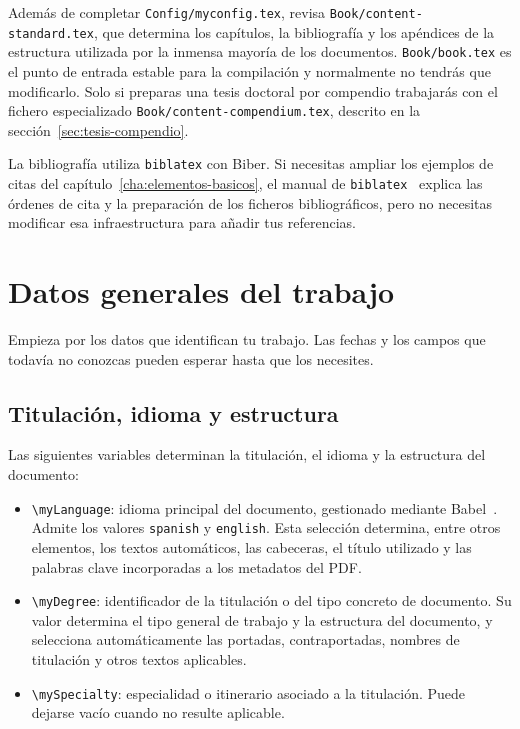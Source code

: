 Además de completar \texttt{Config/myconfig.tex}, revisa \texttt{Book/content-standard.tex}, que determina los capítulos, la bibliografía y los apéndices de la estructura utilizada por la inmensa mayoría de los documentos. \texttt{Book/book.tex} es el punto de entrada estable para la compilación y normalmente no tendrás que modificarlo. Solo si preparas una tesis doctoral por compendio trabajarás con el fichero especializado \texttt{Book/content-compendium.tex}, descrito en la sección~\ref{sec:tesis-compendio}.

La bibliografía utiliza \texttt{biblatex} con Biber. Si necesitas ampliar los ejemplos de citas del capítulo~\ref{cha:elementos-basicos}, el manual de \texttt{biblatex}~\cite{biblatex-manual} explica las órdenes de cita y la preparación de los ficheros bibliográficos, pero no necesitas modificar esa infraestructura para añadir tus referencias.

\section{Datos generales del trabajo}
\label{sec:datos-generales-configuracion}

Empieza por los datos que identifican tu trabajo. Las fechas y los campos que todavía no conozcas pueden esperar hasta que los necesites.

\subsection{Titulación, idioma y estructura}

Las siguientes variables determinan la titulación, el idioma y la estructura del documento:

\begin{itemize}
  \item \texttt{\textbackslash{}myLanguage}: idioma principal del documento, gestionado mediante Babel~\cite{babel-manual}. Admite los valores \texttt{spanish} y \texttt{english}. Esta selección determina, entre otros elementos, los textos automáticos, las cabeceras, el título utilizado y las palabras clave incorporadas a los metadatos del PDF.
  \item \texttt{\textbackslash{}myDegree}: identificador de la titulación o del tipo concreto de documento. Su valor determina el tipo general de trabajo y la estructura del documento, y selecciona automáticamente las portadas, contraportadas, nombres de titulación y otros textos aplicables.
  \item \texttt{\textbackslash{}mySpecialty}: especialidad o itinerario asociado a la titulación. Puede dejarse vacío cuando no resulte aplicable.
\end{itemize}

